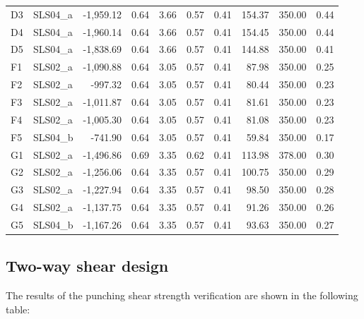 \begin{center}
\begin{tabular}{|l|l|r|r|r|r|r|r|r|r|}
 D3 &  SLS04\_a & -1,959.12 & 0.64 & 3.66 & 0.57 & 0.41 & 154.37 & 350.00 & 0.44\\
 D4 &  SLS04\_a & -1,960.14 & 0.64 & 3.66 & 0.57 & 0.41 & 154.45 & 350.00 & 0.44\\
 D5 &  SLS04\_a & -1,838.69 & 0.64 & 3.66 & 0.57 & 0.41 & 144.88 & 350.00 & 0.41\\
 F1 &  SLS02\_a & -1,090.88 & 0.64 & 3.05 & 0.57 & 0.41 & 87.98 & 350.00 & 0.25\\
 F2 &  SLS02\_a & -997.32 & 0.64 & 3.05 & 0.57 & 0.41 & 80.44 & 350.00 & 0.23\\
 F3 &  SLS02\_a & -1,011.87 & 0.64 & 3.05 & 0.57 & 0.41 & 81.61 & 350.00 & 0.23\\
 F4 &  SLS02\_a & -1,005.30 & 0.64 & 3.05 & 0.57 & 0.41 & 81.08 & 350.00 & 0.23\\
 F5 &  SLS04\_b & -741.90 & 0.64 & 3.05 & 0.57 & 0.41 & 59.84 & 350.00 & 0.17\\
 G1 &  SLS02\_a & -1,496.86 & 0.69 & 3.35 & 0.62 & 0.41 & 113.98 & 378.00 & 0.30\\
 G2 &  SLS02\_a & -1,256.06 & 0.64 & 3.35 & 0.57 & 0.41 & 100.75 & 350.00 & 0.29\\
 G3 &  SLS02\_a & -1,227.94 & 0.64 & 3.35 & 0.57 & 0.41 & 98.50 & 350.00 & 0.28\\
 G4 &  SLS02\_a & -1,137.75 & 0.64 & 3.35 & 0.57 & 0.41 & 91.26 & 350.00 & 0.26\\
 G5 &  SLS04\_b & -1,167.26 & 0.64 & 3.35 & 0.57 & 0.41 & 93.63 & 350.00 & 0.27\\
\hline
  \end{tabular}
  \end{center}

\subsection{Two-way shear design}
The results of the punching shear strength verification are shown in the following table:

